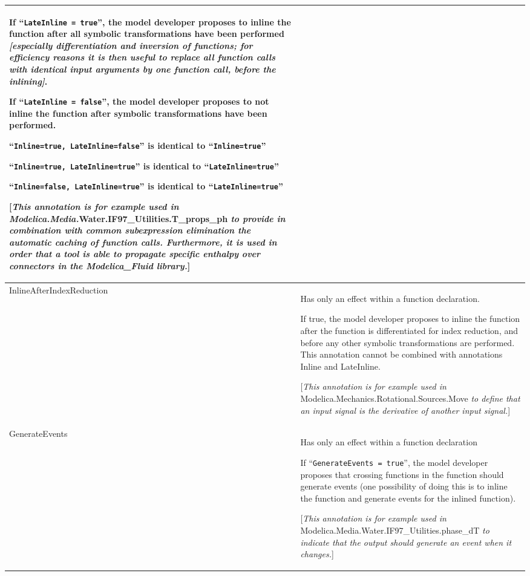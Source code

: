 \documentclass[10pt,a4paper]{report}
\begin{document}
\begin{longtable}[]{|p{4.2cm}|p{10cm}|}
If ``\lstinline!LateInline = true!'', the model developer proposes to inline the
function after all symbolic transformations have been performed
\emph{{[}especially differentiation and inversion of functions; for
efficiency reasons it is then useful to replace all function calls with
identical input arguments by one function call, before the inlining{]}}.

If ``\lstinline!LateInline = false!'', the model developer proposes to not inline
the function after symbolic transformations have been performed.

``\lstinline!Inline=true, LateInline=false!'' is identical to ``\lstinline!Inline=true!''

``\lstinline!Inline=true, LateInline=true!'' is identical to ``\lstinline!LateInline=true!''

``\lstinline!Inline=false, LateInline=true!'' is identical to ``\lstinline!LateInline=true!''

{[}\emph{This annotation is for example used in
Modelica\allowbreak{}.Media\allowbreak{}.}Water\allowbreak{}.IF97\_Utilities\allowbreak{}.T\_props\_ph \emph{to provide in
combination with common subexpression elimination the automatic caching
of function calls. Furthermore, it is used in order that a tool is able
to propagate specific enthalpy over connectors in the Modelica\_Fluid
library.}{]}\\ \hline
InlineAfterIndexReduction\strut
&
Has only an effect within a function declaration.

If true, the model developer proposes to inline the function after the
function is differentiated for index reduction, and before any other
symbolic transformations are performed. This annotation cannot be
combined with annotations Inline and LateInline.

{[}\emph{This annotation is for example used in}
Modelica\allowbreak{}.Mechanics\allowbreak{}.Rotational\allowbreak{}.Sources\allowbreak{}.Move \emph{to define that an input
signal is the derivative of another input signal.}{]}\\ \hline
GenerateEvents\strut
&
Has only an effect within a function declaration

If ``\lstinline!GenerateEvents = true!'', the model developer proposes that crossing
functions in the function should generate events (one possibility of
doing this is to inline the function and generate events for the inlined
function).

{[}\emph{This annotation is for example used in}
Modelica\allowbreak{}.Media\allowbreak{}.Water\allowbreak{}.IF97\_Utilities.phase\_dT \emph{to indicate that
the output should generate an event when it changes.}{]}\\ \hline

\end{longtable}
\end{document}
